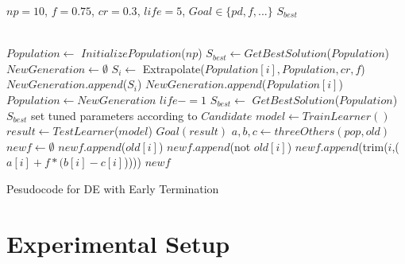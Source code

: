 \documentclass[10pt, journal, compsoc]{IEEEtran}
\begin{document}
\begin{algorithm}[htbp!]
  
  \scriptsize
  \begin{algorithmic}[1]
    \Require $\mathit{np} = 10$, $f=0.75$, $cr=0.3$, $\mathit{life} = 5$, $\mathit{Goal} \in \{\mathit{pd},f,...\}$
    \Ensure $S_{best}$
    
    ~\\
    \State $Population  \gets $ $InitializePopulation$($\mathit{np}$)   
    \State $S_{best} \gets $$GetBestSolution$($Population $)
    \State $NewGeneration \gets \emptyset$
    \State $S_i \gets$ Extrapolate($Population [i], Population , cr, f$)
    \State $NewGeneration$.$append$($S_i$)
    \Else
    \State $NewGeneration$.$append$($Population [i]$)
    \EndIf
    \EndFor
    \State $Population  \gets NewGeneration$
    \State $life -=1$
    \EndIf
    \State $S_{best} \gets$ $GetBestSolution$($Population $)
    \EndWhile
    \State \Return $S_{best}$
    \EndFunction
    \State set tuned parameters according to $Candidate$
    \State $model \gets$$TrainLearner()$
    \State $result \gets$$TestLearner$($model$)   
    \State \Return$\mathit{Goal}(result)$  
    \EndFunction
    \State $a, b, c\gets threeOthers(pop,old)$  
    \State $newf \gets \emptyset$
    \State $newf$.$append$($old[i]$)
    \Else
    \State $newf$.$append$(not $old[i]$)
    \Else
    \State $newf$.$append$(trim($i$,($a[i] + f * (b[i] - c[i]$)))) 
    \EndIf
    \EndIf
    \EndFor
    \State \Return $newf$
    \EndFunction
  \end{algorithmic} 
  \caption{Pesudocode for DE with Early Termination}
  \label{alg:DE}
\end{algorithm}
\section{Experimental Setup}
\end{document}
